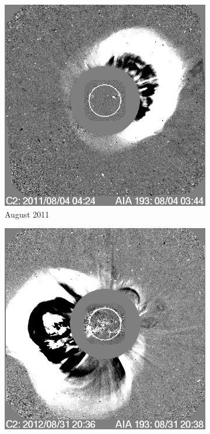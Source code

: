 \begin{figure}[h!]
    \begin{subfigure}[b]{0.3\textwidth}
        \centering
        \includegraphics[width=\textwidth]{images/soho_cme_aug_04_2011.png}
        \caption[August  2011 CME]{August  2011}
        \label{fig:soho_cme_aug_04_2011}
    \end{subfigure}
    \hfill
    \begin{subfigure}[b]{0.3\textwidth}
        \includegraphics[width=\textwidth]{images/soho_cme_aug_31_2012.png}

\end{subfigure}
\end{figure}
